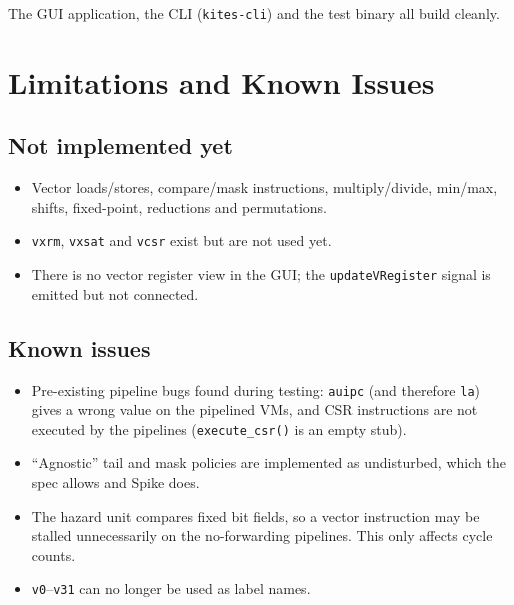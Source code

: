 \documentclass{article}
\begin{document}
The GUI application, the CLI (\texttt{kites-cli}) and the test binary all build cleanly.

\section*{Limitations and Known Issues}
\subsection*{Not implemented yet}
\begin{itemize}
    \item Vector loads/stores, compare/mask instructions, multiply/divide, min/max, shifts,
    fixed-point, reductions and permutations.
    \item \texttt{vxrm}, \texttt{vxsat} and \texttt{vcsr} exist but are not used yet.
    \item There is no vector register view in the GUI; the \texttt{updateVRegister} signal is
    emitted but not connected.
\end{itemize}

\subsection*{Known issues}
\begin{itemize}
    \item Pre-existing pipeline bugs found during testing: \texttt{auipc} (and therefore
    \texttt{la}) gives a wrong value on the pipelined VMs, and CSR instructions are not executed
    by the pipelines (\texttt{execute\_csr()} is an empty stub).
    \item ``Agnostic'' tail and mask policies are implemented as undisturbed, which the spec allows
    and Spike does.
    \item The hazard unit compares fixed bit fields, so a vector instruction may be stalled
    unnecessarily on the no-forwarding pipelines. This only affects cycle counts.
    \item \texttt{v0}--\texttt{v31} can no longer be used as label names.
\end{itemize}
\end{document}
